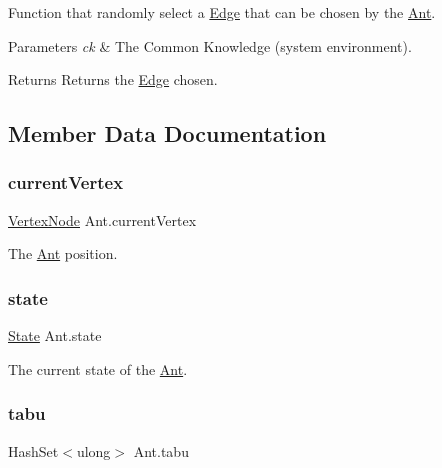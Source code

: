 Function that randomly select a \hyperlink{classEdge}{Edge} that can be chosen by the \hyperlink{classAnt}{Ant}. 


\begin{DoxyParams}{Parameters}
{\em ck} & The Common Knowledge (system environment).\\
\hline
\end{DoxyParams}
\begin{DoxyReturn}{Returns}
Returns the \hyperlink{classEdge}{Edge} chosen.
\end{DoxyReturn}


\subsection{Member Data Documentation}
\mbox{\label{classAnt_ad7954946f86084f0a16d70e541403d02}} 
\subsubsection{\texorpdfstring{current\+Vertex}{currentVertex}}
{\footnotesize\ttfamily \hyperlink{classVertexNode}{Vertex\+Node} Ant.\+current\+Vertex\hspace{0.3cm}{\ttfamily [private]}}



The \hyperlink{classAnt}{Ant} position.

\mbox{\label{classAnt_ad928c0af6e263b134e8f2cb092cfd70e}} 
\subsubsection{\texorpdfstring{state}{state}}
{\footnotesize\ttfamily \hyperlink{classAnt_aead9977653848889b0d5e07a50602de6}{State} Ant.\+state\hspace{0.3cm}{\ttfamily [private]}}



The current state of the \hyperlink{classAnt}{Ant}.

\mbox{\label{classAnt_a9415e1d7fd0c6a64bf6bcfc8885fa4ef}} 
\subsubsection{\texorpdfstring{tabu}{tabu}}
{\footnotesize\ttfamily Hash\+Set$<$ulong$>$ Ant.\+tabu\hspace{0.3cm}{\ttfamily [private]}}



